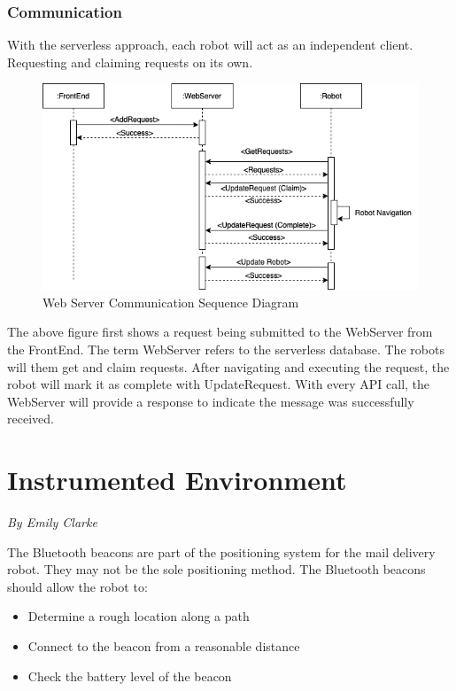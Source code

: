 \documentclass[12pt]{report}
\newcommand{\sectionAuthor}[1]{{\small\vspace{-1em}\textit{#1}}\bigskip\par}
\begin{document}
\subsubsection{Communication}
With the serverless approach, each robot will act as an independent client. Requesting and claiming requests on its own.

\begin{figure}[H]
\caption{Web Server Communication Sequence Diagram}
\centering
\includegraphics[scale=0.7]{images/CommunicationSequenceDiagram.png}
\centering
\end{figure}

The above figure first shows a request being submitted to the WebServer from the FrontEnd. The term WebServer refers to the serverless database. The robots will them get and claim requests. After navigating and executing the request, the robot will mark it as complete with UpdateRequest. With every API call, the WebServer will provide a response to indicate the message was successfully received.


\section{Instrumented Environment}
\sectionAuthor{By Emily Clarke}
The Bluetooth beacons are part of the positioning system for the mail delivery robot. They may not be the sole positioning method. The Bluetooth beacons should allow the robot to:
\begin{itemize}
\itemsep0em 
\item Determine a rough location along a path
\item Connect to the beacon from a reasonable distance
\item Check the battery level of the beacon
\end{itemize}
\end{document}
